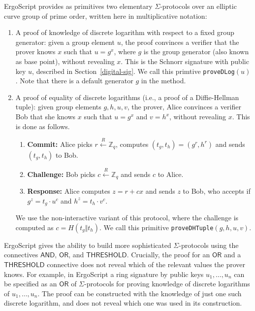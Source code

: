 \documentclass[11pt]{article}
\newcommand{\authnote}[2]{\marginpar{\parbox{\marginparwidth}{\tiny %
  \textsf{#1 {\textcolor{blue}{notes: #2}}}}}%
  \textcolor{blue}{\textbf{\dag}}}
\newcommand{\authnote}[2]{
  \textsf{#1 \textcolor{blue}{: #2}}}
\newcommand{\authnote}[2]{}
\newcommand{\snote}[1]{{\authnote{\textcolor{yellow}{Scalahub notes}}{#1}}}
\newcommand{\langname}{ErgoScript\xspace}
\newcommand{\andnode}{\ensuremath{\mathsf{AND}}}
\newcommand{\ornode}{\ensuremath{\mathsf{OR}}}
\newcommand{\tnode}{\ensuremath{\mathsf{THRESHOLD}}}
\begin{document}
\langname provides as primitives two elementary $\Sigma$-protocols over an elliptic curve group of prime order, written here in multiplicative notation:
\begin{enumerate}
\item A proof of knowledge of discrete logarithm with respect to a fixed group generator: given a group element $u$, the proof convinces a verifier that the prover knows $x$ such that $u=g^x$, where $g$ is the group generator (also known as base point), without revealing $x$. This is the Schnorr signature with public key $u$, described in Section~\ref{digital-sig}.
We call this primtive \texttt{proveDLog}$(u)$. Note that there is a default generator $g$ in the method. 
 
\snote{What is the exact input to the hash function? (what forms the message?)}

\item A proof of equality of discrete logarithms (i.e., a proof of a Diffie-Hellman tuple): given group elements $g, h, u, v$, the prover, Alice convinces a verifier Bob that she knows $x$ such that $u={g}^x$ and $v={h}^x$, without revealing $x$. This is done as follows. 
\begin{enumerate}
	\item \textbf{Commit:} Alice picks $r \stackrel{R}{\leftarrow} \mathbb{Z}_q$, computes $(t_g, t_h) = ({g}^r, {h}^r)$ and sends $(t_g, t_h)$ to Bob.
	\item \textbf{Challenge:} Bob picks $c \stackrel{R}{\leftarrow} \mathbb{Z}_q$ and sends $c$ to Alice.
	\item \textbf{Response:} Alice computes $z = r + cx$ and sends $z$ to Bob, who accepts if ${g}^z = {t_g}\cdot {u}^c$ and $h^z=t_h\cdot v^c$. %
\end{enumerate}

We use the non-interactive variant of this protocol, where the challenge is computed as $c = H(t_g \Vert t_h)$. We call this primitive \texttt{proveDHTuple}$(g, h, u, v)$.

\snote{What is the exact input to the hash function?}

\end{enumerate}

\langname gives the ability to build more sophisticated $\Sigma$-protocols using the connectives $\andnode$, $\ornode$, and $\tnode$. 
Crucially, the proof for an $\ornode$ and a $\tnode$ connective does not reveal which of the relevant values the prover knows. For example, in \langname a ring signature by public keys $u_1, \dots, u_n$ can be specified as an $\ornode$ of $\Sigma$-protocols for proving knowledge of discrete logarithms of $u_1, \dots, u_n$. The proof can be constructed with the knowledge of just one such discrete logarithm, and does not reveal which one was used in its construction. 
\end{document}
